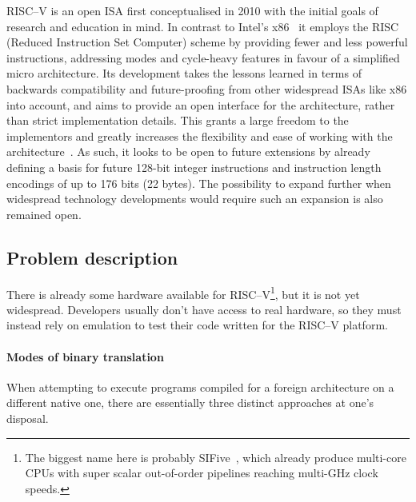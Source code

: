 RISC--V is an open ISA first conceptualised in 2010 with the initial goals of research and education in mind.
In contrast to Intel's x86~\cite{intel2017man} it employs the RISC (Reduced Instruction Set Computer) scheme by providing fewer and less powerful instructions, addressing modes and cycle-heavy features in favour of a simplified micro architecture.
Its development takes the lessons learned in terms of backwards compatibility and future-proofing from other widespread ISAs like x86 into account, and aims to provide an open interface for the architecture, rather than strict implementation details.
This grants a large freedom to the implementors and greatly increases the flexibility and ease of working with the architecture~\cite[S. 1f]{riscvspec}.
As such, it looks to be open to future extensions by already defining a basis for future 128-bit integer instructions and instruction length encodings of up to 176 bits (22 bytes).
The possibility to expand further when widespread technology developments would require such an expansion is also remained open.


\subsection{Problem description}
There is already some hardware available for RISC--V\footnote{The biggest name here is probably SIFive~\cite{sifive}, which already produce multi-core CPUs with super scalar out-of-order pipelines reaching multi-GHz clock speeds.}, but it is not yet widespread.
Developers usually don't have access to real hardware, so they must instead rely on emulation to test their code written for the RISC--V platform.

\paragraph{Modes of binary translation}
When attempting to execute programs compiled for a foreign architecture on a different native one, there are essentially three distinct approaches at one's disposal.

